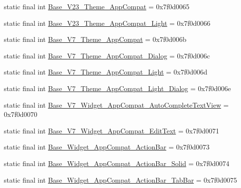 \begin{DoxyCompactItemize}
\item 
static final int \mbox{\hyperlink{classcom_1_1google_1_1android_1_1gms_1_1R_1_1style_a66d4657c960553f3b9fe88a7f1e2811d}{Base\+\_\+\+V23\+\_\+\+Theme\+\_\+\+App\+Compat}} = 0x7f0d0065
\item 
static final int \mbox{\hyperlink{classcom_1_1google_1_1android_1_1gms_1_1R_1_1style_ae745a8cc9da8e238989bf1f7cc807fd3}{Base\+\_\+\+V23\+\_\+\+Theme\+\_\+\+App\+Compat\+\_\+\+Light}} = 0x7f0d0066
\item 
static final int \mbox{\hyperlink{classcom_1_1google_1_1android_1_1gms_1_1R_1_1style_a3a3b430dee39274f8390a35095fdb4d5}{Base\+\_\+\+V7\+\_\+\+Theme\+\_\+\+App\+Compat}} = 0x7f0d006b
\item 
static final int \mbox{\hyperlink{classcom_1_1google_1_1android_1_1gms_1_1R_1_1style_a89ae13a37f7bab58659cd11eddf185e4}{Base\+\_\+\+V7\+\_\+\+Theme\+\_\+\+App\+Compat\+\_\+\+Dialog}} = 0x7f0d006c
\item 
static final int \mbox{\hyperlink{classcom_1_1google_1_1android_1_1gms_1_1R_1_1style_abf229dcffc49d4578c50498350c8f593}{Base\+\_\+\+V7\+\_\+\+Theme\+\_\+\+App\+Compat\+\_\+\+Light}} = 0x7f0d006d
\item 
static final int \mbox{\hyperlink{classcom_1_1google_1_1android_1_1gms_1_1R_1_1style_ac37436633b2d347c7b9f7515de8d6a7e}{Base\+\_\+\+V7\+\_\+\+Theme\+\_\+\+App\+Compat\+\_\+\+Light\+\_\+\+Dialog}} = 0x7f0d006e
\item 
static final int \mbox{\hyperlink{classcom_1_1google_1_1android_1_1gms_1_1R_1_1style_a307e511dcccd53071c011a61847776a9}{Base\+\_\+\+V7\+\_\+\+Widget\+\_\+\+App\+Compat\+\_\+\+Auto\+Complete\+Text\+View}} = 0x7f0d0070
\item 
static final int \mbox{\hyperlink{classcom_1_1google_1_1android_1_1gms_1_1R_1_1style_ad388b9c754c45b98fd63f92db7b5b7dc}{Base\+\_\+\+V7\+\_\+\+Widget\+\_\+\+App\+Compat\+\_\+\+Edit\+Text}} = 0x7f0d0071
\item 
static final int \mbox{\hyperlink{classcom_1_1google_1_1android_1_1gms_1_1R_1_1style_a8853e95330408c0e0eb0c068d04b38c4}{Base\+\_\+\+Widget\+\_\+\+App\+Compat\+\_\+\+Action\+Bar}} = 0x7f0d0073
\item 
static final int \mbox{\hyperlink{classcom_1_1google_1_1android_1_1gms_1_1R_1_1style_a5887192eaeb49d2bf11951ed2ea73a37}{Base\+\_\+\+Widget\+\_\+\+App\+Compat\+\_\+\+Action\+Bar\+\_\+\+Solid}} = 0x7f0d0074
\item 
static final int \mbox{\hyperlink{classcom_1_1google_1_1android_1_1gms_1_1R_1_1style_a2f173eb5d8b62cb438bfc94161a426a8}{Base\+\_\+\+Widget\+\_\+\+App\+Compat\+\_\+\+Action\+Bar\+\_\+\+Tab\+Bar}} = 0x7f0d0075

\end{DoxyCompactItemize}
